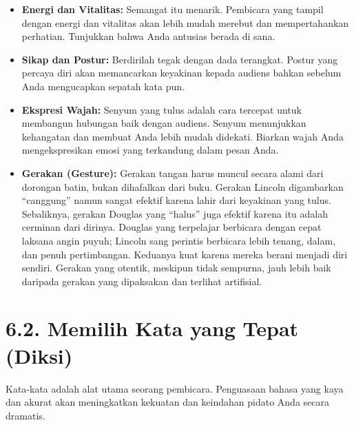 \documentclass[
  letterpaper,
  DIV=11,
  numbers=noendperiod]{scrreprt}
\begin{document}
\begin{itemize}
\item
  \textbf{Energi dan Vitalitas:} Semangat itu menarik. Pembicara yang
  tampil dengan energi dan vitalitas akan lebih mudah merebut dan
  mempertahankan perhatian. Tunjukkan bahwa Anda antusias berada di
  sana.
\item
  \textbf{Sikap dan Postur:} Berdirilah tegak dengan dada terangkat.
  Postur yang percaya diri akan memancarkan keyakinan kepada audiens
  bahkan sebelum Anda mengucapkan sepatah kata pun.
\item
  \textbf{Ekspresi Wajah:} Senyum yang tulus adalah cara tercepat untuk
  membangun hubungan baik dengan audiens. Senyum menunjukkan kehangatan
  dan membuat Anda lebih mudah didekati. Biarkan wajah Anda
  mengekspresikan emosi yang terkandung dalam pesan Anda.
\item
  \textbf{Gerakan (Gesture):} Gerakan tangan harus muncul secara alami
  dari dorongan batin, bukan dihafalkan dari buku. Gerakan Lincoln
  digambarkan ``canggung'' namun sangat efektif karena lahir dari
  keyakinan yang tulus. Sebaliknya, gerakan Douglas yang ``halus'' juga
  efektif karena itu adalah cerminan dari dirinya. Douglas yang
  terpelajar berbicara dengan cepat laksana angin puyuh; Lincoln sang
  perintis berbicara lebih tenang, dalam, dan penuh pertimbangan.
  Keduanya kuat karena mereka berani menjadi diri sendiri. Gerakan yang
  otentik, meskipun tidak sempurna, jauh lebih baik daripada gerakan
  yang dipaksakan dan terlihat artifisial.
\end{itemize}

\section{\texorpdfstring{\textbf{6.2. Memilih Kata yang Tepat
(Diksi)}}{6.2. Memilih Kata yang Tepat (Diksi)}}\label{memilih-kata-yang-tepat-diksi}

Kata-kata adalah alat utama seorang pembicara. Penguasaan bahasa yang
kaya dan akurat akan meningkatkan kekuatan dan keindahan pidato Anda
secara dramatis.
\end{document}
